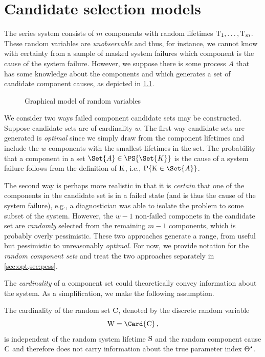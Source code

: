 \documentclass[../main.tex]{subfiles}
\begin{document}
\chapter{Candidate selection models}
\label{sec:cand_sel}
The series system consists of $m$ components with random lifetimes $\mathrm{T}_1,\ldots,\mathrm{T}_m$.
These random variables are \emph{unobservable} and thus, for instance, we cannot know with certainty from a sample of masked system failures which component is the cause of the system failure.
However, we suppose there is some process $A$ that has some knowledge about the components and which generates a set of candidate component causes, as depicted in \cref{fig:true_model}.
\begin{figure}
	\label{fig:true_model}
	\caption{Graphical model of random variables}
	\begin{center}
		
	\end{center}
\end{figure}


We consider two ways failed component candidate sets may be constructed.
Suppose candidate sets are of cardinality $w$.
The first way candidate sets are generated is \emph{optimal} since we simply draw from the component lifetimes and include the $w$ components with the smallest lifetimes in the set. The probability that a component in a set $\Set{A} \in \PS{\Set{K}}$ is the cause of a system failure follows from the definition of $\mathrm{K}$, i.e., $\Prob{\RV{K} \in \Set{A}}$.

The second way is perhaps more realistic in that it is \emph{certain} that one of the components in the candidate set is in a failed state (and is thus the cause of the system failure), e.g., a diagnostician was able to isolate the problem to some subset of the system.
However, the $w-1$ non-failed componets in the candidate set are \emph{randomly} selected from the remaining $m-1$ components, which is probably overly pessimistic.
These two approaches generate a range, from useful but pessimistic to unreasonably \emph{optimal}. For now, we provide notation for the \emph{random component sets} and treat the two approaches separately in \cref{sec:opt,sec:pess}.


The \emph{cardinality} of a component set could theoretically convey 
information about the system. As a simplification, we make the following 
assumption.
\begin{assumption}
	\label{asm:indep_W_S}
	The cardinality of the random set $\mathrm{C}$, denoted by the discrete random variable
	\begin{equation}
	\RV{W} = \Card{\rvcand}\,,
	\end{equation}
	is independent of the random system lifetime $\mathrm{S}$ and the random component 
	cause $\mathrm{C}$ and therefore does not carry information about the true 
	parameter index ${\Theta}^{\star}$.
\end{assumption}
\end{document}
